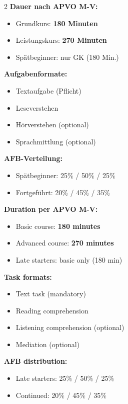 \documentclass[10pt,a4paper]{article}
\begin{document}
\begin{paracol}{2}
\small
\textbf{Dauer nach APVO M-V:}
\begin{itemize}[noitemsep,topsep=2pt]
\item Grundkurs: \textbf{180 Minuten}
\item Leistungskurs: \textbf{270 Minuten}
\item \textcolor{spaet}{Spätbeginner: nur GK (180 Min.)}
\end{itemize}

\textbf{Aufgabenformate:}
\begin{itemize}[noitemsep,topsep=2pt]
\item Textaufgabe (Pflicht)
\item Leseverstehen
\item Hörverstehen (optional)
\item Sprachmittlung (optional)
\end{itemize}

\textbf{AFB-Verteilung:}
\begin{itemize}[noitemsep,topsep=2pt]
\item \textcolor{spaet}{Spätbeginner: 25\% / 50\% / 25\%}
\item Fortgeführt: 20\% / 45\% / 35\%
\end{itemize}

\switchcolumn

\small\color{english}
\textbf{Duration per APVO M-V:}
\begin{itemize}[noitemsep,topsep=2pt]
\item Basic course: \textbf{180 minutes}
\item Advanced course: \textbf{270 minutes}
\item \textcolor{spaet}{Late starters: basic only (180 min)}
\end{itemize}

\textbf{Task formats:}
\begin{itemize}[noitemsep,topsep=2pt]
\item Text task (mandatory)
\item Reading comprehension
\item Listening comprehension (optional)
\item Mediation (optional)
\end{itemize}

\textbf{AFB distribution:}
\begin{itemize}[noitemsep,topsep=2pt]
\item \textcolor{spaet}{Late starters: 25\% / 50\% / 25\%}
\item Continued: 20\% / 45\% / 35\%
\end{itemize}

\end{paracol}
\end{document}
